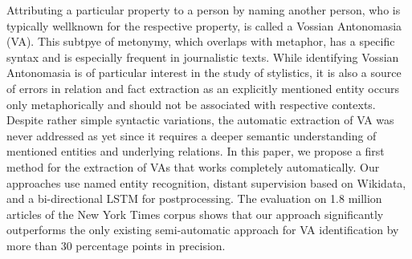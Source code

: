 Attributing a particular property to a person by naming another person, who is typically wellknown for the respective property, is called a Vossian Antonomasia (VA). This subtpye of metonymy, which overlaps with metaphor, has a specific syntax and is especially frequent in journalistic texts. While identifying Vossian Antonomasia is of particular interest in the study of stylistics, it is also a source of errors in relation and fact extraction as an explicitly mentioned entity occurs only metaphorically and should not be associated with respective contexts. Despite rather simple syntactic variations, the automatic extraction of VA was never addressed as yet since it requires a deeper semantic understanding of mentioned entities and underlying relations. In this paper, we propose a first method for the extraction of VAs that works completely automatically. Our approaches use named entity recognition, distant supervision based on Wikidata, and a bi-directional LSTM for postprocessing. The evaluation on 1.8 million articles of the New York Times corpus shows that our approach significantly outperforms the only existing
semi-automatic approach for VA identification by more than 30 percentage points in precision.